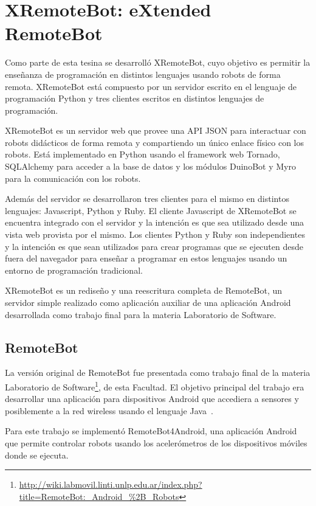 \chapter{XRemoteBot: eXtended RemoteBot}\label{cha:xremotebot}
Como parte de esta tesina se desarrolló XRemoteBot, cuyo objetivo
es permitir la enseñanza de programación en distintos lenguajes usando
robots de forma remota. XRemoteBot está compuesto por un servidor
escrito en el lenguaje de programación Python y tres clientes escritos
en distintos lenguajes de programación.

XRemoteBot es un servidor web que provee una API JSON para interactuar
con robots didácticos de forma remota y compartiendo un único enlace
físico con los robots. Está implementado en Python usando el
framework web Tornado, SQLAlchemy para acceder a la base de datos
y los módulos DuinoBot y Myro para
la comunicación con los robots.

Además del servidor se desarrollaron tres clientes para el mismo en distintos
lenguajes: Javascript, Python y Ruby. El cliente Javascript de XRemoteBot
se encuentra
integrado con el servidor y la intención es que sea utilizado desde una
vista web provista por el mismo. Los clientes Python y Ruby
son independientes y la intención es que sean utilizados para crear programas
que se ejecuten desde fuera del navegador para enseñar
a programar en estos lenguajes usando un entorno de programación
tradicional.

XRemoteBot
es un rediseño y una reescritura completa de RemoteBot, un servidor
simple realizado como aplicación auxiliar de una aplicación Android
desarrollada
como trabajo final para la materia Laboratorio de Software.

\section{RemoteBot}\label{sec:remotebot}

La versión original de RemoteBot fue presentada como trabajo final
de la materia Laboratorio de
Software\footnote{\url{http://wiki.labmovil.linti.unlp.edu.ar/index.php?title=RemoteBot:_Android_\%2B_Robots}},
de esta Facultad.
El objetivo principal del trabajo era desarrollar una aplicación para
dispositivos Android que accediera a sensores y posiblemente a la red
wireless usando el lenguaje Java~\citep{queiruga_2013}.

Para este trabajo se implementó RemoteBot4Android,
una aplicación Android
que permite controlar robots usando los acelerómetros de los dispositivos
móviles donde se ejecuta.

